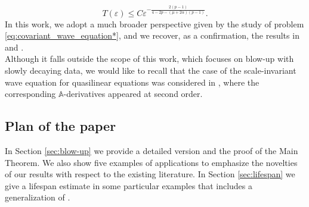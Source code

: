 \documentclass[11pt,reqno]{amsart}
\theoremstyle{definition}
\numberwithin{equation}{section}
\newcommand{\eps}{\varepsilon}
\newcommand{\A}{\mathbb{A}}
\begin{document}
%
\begin{equation}
T(\eps)\leq C \eps^{-\frac{2(p-1)}{4-2p-(\mu+2\alpha)(p-1)}}.
\end{equation}
In this work, we adopt a much broader perspective given by the study of problem \eqref{eq:covariant_wave_equation*}, and we recover, as a confirmation, the results in \cite{CGL2021} and \cite{GirardiLucente2021}. \\
Although it falls outside the scope of this work, which focuses on blow-up with slowly decaying data, we would like to recall that the case of the scale-invariant wave equation for quasilinear equations was considered in \cite{GeorgievLucente2021}, where the corresponding $\A$-derivatives appeared at second order.

\subsection{Plan of the paper} 
In Section \ref{sec:blow-up} we provide a detailed version and the proof of the Main Theorem. We also show five examples of applications to emphasize the novelties of our results with respect to the existing literature. 
In Section \ref{sec:lifespan} we give a lifespan estimate in some particular examples that includes a generalization of \cite{CGL2021}.  
\end{document}
